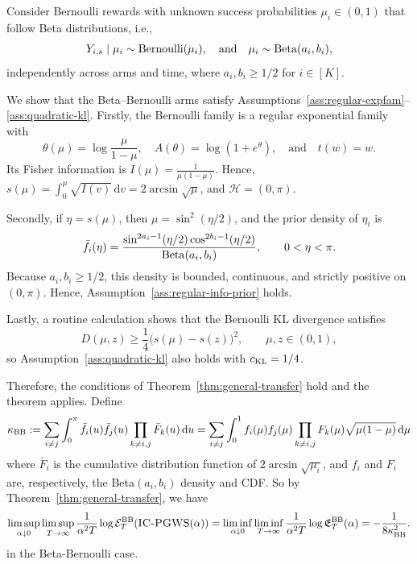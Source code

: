 \documentclass[10pt]{article}
\newcommand{\dd}{\mathrm{d}}
\theoremstyle{plain}
\begin{document}
\begin{example}
\label{ex:beta-bernoulli}
Consider Bernoulli rewards with unknown success probabilities
\(\mu_i\in(0,1)\) that follow  Beta distributions, i.e., 
\[
    Y_{i,s}\mid \mu_i \sim {\rm Bernoulli}(\mu_i),
    \quad\mbox{and}\quad
    \mu_i\sim {\rm Beta}(a_i,b_i),
\]
independently across arms and time, where  \(a_i,b_i\ge 1/2\) for \(i \in [K]\).

 We show that the Beta--Bernoulli arms satisfy Assumptions~\ref{ass:regular-expfam}--\ref{ass:quadratic-kl}.
Firstly,
the Bernoulli family is a regular exponential family with
\[
    \theta(\mu)=\log\frac{\mu}{1-\mu},
    \quad
    A(\theta)=\log(1+e^\theta),
    \quad\mbox{and}\quad
    t(w)=w .
\]
Its Fisher information  is $I(\mu)=\frac{1}{\mu(1-\mu)}$. Hence, $s(\mu)= \int_0^\mu\sqrt{I(v)}\, \dd v= 2\arcsin\sqrt{\mu}$, and  $\mathcal H=(0,\pi)$.

Secondly, if \(\eta=s(\mu)\), then \(\mu=\sin^2(\eta/2)\), and the prior density of \(\eta_i\) is
\[
    \bar f_i(\eta)
    =
    \frac{
        \sin^{2a_i-1}(\eta/2)\cos^{2b_i-1}(\eta/2)
    }{
        {\rm Beta}(a_i,b_i)
    },
    \qquad 0<\eta<\pi .
\]
Because \(a_i,b_i\ge1/2\), this density is bounded, continuous, and strictly
positive on \((0,\pi)\). Hence, Assumption~\ref{ass:regular-info-prior} holds.

Lastly, a routine calculation shows that the Bernoulli KL divergence satisfies %
\[
    D(\mu,z)
    \ge
    \frac{1}{4}\big(s(\mu)-s(z)\big)^2,
    \qquad \mu,z\in(0,1),
\]
so Assumption~\ref{ass:quadratic-kl} also holds with $c_{\rm KL}=1/4$.

Therefore, the conditions of  Theorem~\ref{thm:general-transfer} hold and the theorem applies. Define
\[
    \kappa_{\rm BB}
    :=
    \sum_{i\neq j}
    \int_0^\pi
        \bar f_i(u)\bar f_j(u)
        \prod_{k\neq i,j}\bar F_k(u)
    \,\dd u 
    =
    \sum_{i\neq j}
    \int_0^1
        f_i(\mu)f_j(\mu)
        \prod_{k\neq i,j}F_k(\mu)
        \sqrt{\mu(1-\mu)}
    \,\dd\mu
\]
where \(\bar F_i\) is the cumulative distribution function  of \(2\arcsin\sqrt{\mu_i}\), and \(f_i\) and \(F_i\) are, respectively, the Beta\((a_i,b_i)\) density and CDF. So by Theorem~\ref{thm:general-transfer}, we have
\[
    \limsup_{\alpha\downarrow0}
    \limsup_{T\to\infty}
    \frac{1}{\alpha^2T}
    \log \mathcal E_{T}^{\rm BB}(\text{\textsc{IC-PGWS}}(\alpha))
    =\liminf_{\alpha\downarrow0}
    \liminf_{T\to\infty}
    \frac{1}{\alpha^2T}
    \log \mathfrak E_{T}^{\rm BB}(\alpha)
    =
    -\frac{1}{8\kappa^2_{\rm {BB}}}.
\]
in the Beta-Bernoulli case.
\end{example}
\end{document}
